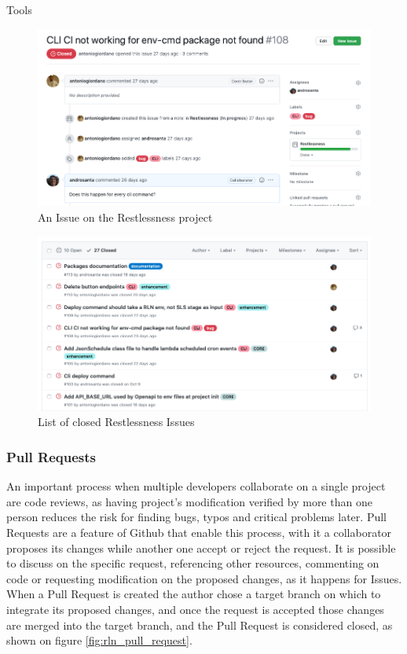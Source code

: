 \begin{chapter}{Tools}
    \begin{figure}
        \centering
        \includegraphics[width=\linewidth]{source/images/github-rln-issue.png}
        \caption{An Issue on the Restlessness project}
        \label{fig:rln_issue}
    \end{figure}

    \begin{figure}
        \centering
        \includegraphics[width=\linewidth]{source/images/github-rln-issues-list.png}
        \caption{List of closed Restlessness Issues}
        \label{fig:rln_issues_list}
    \end{figure}

    \subsubsection{Pull Requests}
    An important process when multiple developers collaborate on a single project
    are code reviews, as having project's modification verified by more than one
    person reduces the risk for finding bugs, typos and critical problems later.
    Pull Requests are a feature of Github that enable this process, with it a
    collaborator proposes its changes while another one accept or reject the request.
    It is possible to discuss on the specific request, referencing other resources,
    commenting on code or requesting modification on the proposed changes, as it
    happens for Issues.
    When a Pull Request is created the author chose a target branch on which to
    integrate its proposed changes, and once the request is accepted those changes
    are merged into the target branch, and the Pull Request is considered closed,
    as shown on figure \ref{fig:rln_pull_request}.


\end{chapter}
